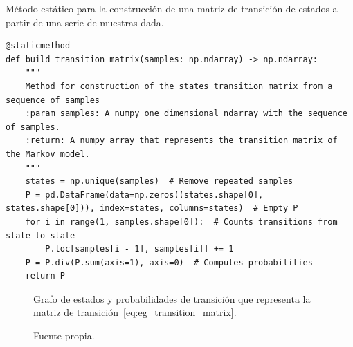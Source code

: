 \begin{code}
    \caption{Método estático para la construcción de una matriz de transición de estados a partir de una serie de muestras dada.}
    \label{code:build_transition_matrix}
    \centering
    \begin{verbatim}
@staticmethod
def build_transition_matrix(samples: np.ndarray) -> np.ndarray:
    """
    Method for construction of the states transition matrix from a sequence of samples
    :param samples: A numpy one dimensional ndarray with the sequence of samples.
    :return: A numpy array that represents the transition matrix of the Markov model.
    """
    states = np.unique(samples)  # Remove repeated samples
    P = pd.DataFrame(data=np.zeros((states.shape[0], states.shape[0])), index=states, columns=states)  # Empty P
    for i in range(1, samples.shape[0]):  # Counts transitions from state to state
        P.loc[samples[i - 1], samples[i]] += 1
    P = P.div(P.sum(axis=1), axis=0)  # Computes probabilities
    return P
    \end{verbatim}
\end{code}
\begin{figure}[!h]
    \caption{Grafo de estados y probabilidades de transición que representa la matriz de transición~\eqref{eq:eg_transition_matrix}.}
    \label{fig:eg_automata}
    \centering
    \caption*{\footnotesize Fuente propia.}
\end{figure}

